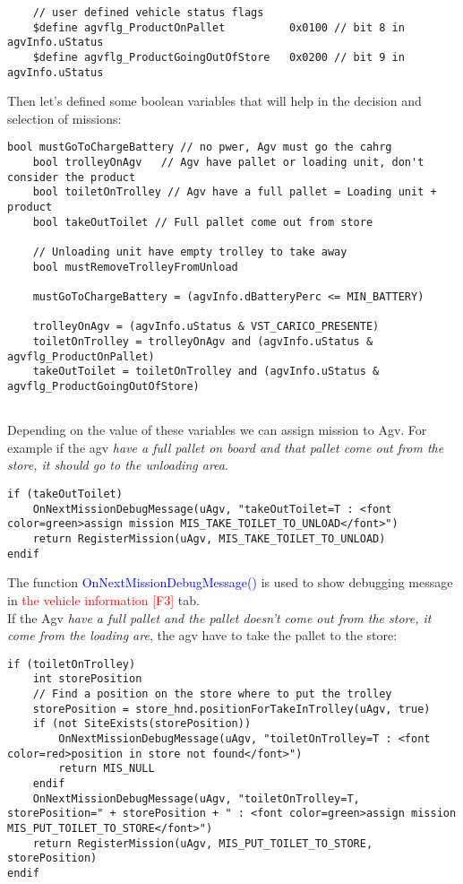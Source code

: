 \begin{lstlisting}
	// user defined vehicle status flags
	$define agvflg_ProductOnPallet			0x0100 // bit 8 in agvInfo.uStatus
	$define agvflg_ProductGoingOutOfStore	0x0200 // bit 9 in agvInfo.uStatus
\end{lstlisting}

Then let's defined some boolean variables that will help in the decision and selection of missions:

\begin{lstlisting}[caption = Desision variables or plant status]
	bool mustGoToChargeBattery // no pwer, Agv must go the cahrg
	bool trolleyOnAgv	// Agv have pallet or loading unit, don't consider the product
	bool toiletOnTrolley // Agv have a full pallet = Loading unit + product
	bool takeOutToilet // Full pallet come out from store
	
	// Unloading unit have empty trolley to take away
	bool mustRemoveTrolleyFromUnload
	
	mustGoToChargeBattery = (agvInfo.dBatteryPerc <= MIN_BATTERY)
	
	trolleyOnAgv = (agvInfo.uStatus & VST_CARICO_PRESENTE)
	toiletOnTrolley = trolleyOnAgv and (agvInfo.uStatus & agvflg_ProductOnPallet)
	takeOutToilet = toiletOnTrolley and (agvInfo.uStatus & agvflg_ProductGoingOutOfStore)
	
\end{lstlisting} 

Depending on the value of these variables we can assign mission to Agv. For example if the agv \textit{have a full pallet on board and that pallet come out from the store, it should go to the unloading area}.
\begin{lstlisting}[caption= Mission to unloaing area]
if (takeOutToilet)
	OnNextMissionDebugMessage(uAgv, "takeOutToilet=T : <font color=green>assign mission MIS_TAKE_TOILET_TO_UNLOAD</font>")
	return RegisterMission(uAgv, MIS_TAKE_TOILET_TO_UNLOAD)
endif
\end{lstlisting}

The function \textcolor{blue}{OnNextMissionDebugMessage()} is used to show debugging message in  \textcolor{red}{the vehicle information [F3]} tab.\\

If the Agv \textit{have a full pallet and the pallet doesn't come out from the store, it come from the loading are}, the agv have to take the pallet to the store:

\begin{lstlisting}[caption= Mission take full pallet into store]
if (toiletOnTrolley)
	int storePosition
	// Find a position on the store where to put the trolley
	storePosition = store_hnd.positionForTakeInTrolley(uAgv, true)
	if (not SiteExists(storePosition))
		OnNextMissionDebugMessage(uAgv, "toiletOnTrolley=T : <font color=red>position in store not found</font>")
		return MIS_NULL
	endif
	OnNextMissionDebugMessage(uAgv, "toiletOnTrolley=T, storePosition=" + storePosition + " : <font color=green>assign mission MIS_PUT_TOILET_TO_STORE</font>")
	return RegisterMission(uAgv, MIS_PUT_TOILET_TO_STORE, storePosition)
endif	
\end{lstlisting}

